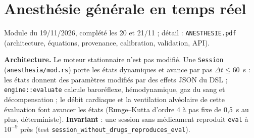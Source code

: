 \documentclass[10pt,a4paper]{article}
\newcommand{\cmd}[1]{\texttt{#1}}
\begin{document}
\section{Anesthésie générale en temps réel}\label{sec:anesth}

Module du 19/11/2026, complété les 20 et 21/11 ; détail : \cmd{ANESTHESIE.pdf} (architecture, équations, provenance, calibration, validation, API).

\textbf{Architecture.} Le moteur stationnaire n'est pas modifié. Une \cmd{Session} (\cmd{anesthesia/mod.rs}) porte les états dynamiques et avance par pas $\Delta t \le 60$~s : les états donnent des paramètres modifiés par des effets JSON du DSL ; \cmd{engine::evaluate} calcule baroréflexe, hémodynamique, gaz du sang et décompensation ; le débit cardiaque et la ventilation alvéolaire de cette évaluation font avancer les états (Runge--Kutta d'ordre 4 à pas fixe de 0,5~s au plus, déterministe). \textbf{Invariant} : une session sans médicament reproduit \cmd{eval} à $10^{-9}$ près (test \cmd{session\_without\_drugs\_reproduces\_eval}).
\end{document}
